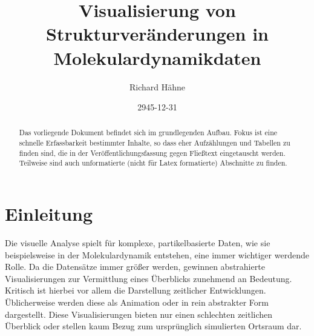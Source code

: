 







\subject{Arbeitsname Bachelorarbeit}
\title{Visualisierung von Strukturveränderungen in Molekulardynamikdaten}

\author{%
	Richard Hähne
}

\date{2945-12-31}


\maketitle

\begin{abstract}
	Das vorliegende Dokument befindet sich im grundlegenden Aufbau. Fokus ist eine schnelle Erfassbarkeit bestimmter Inhalte, so dass eher Aufzählungen und Tabellen zu finden sind, die in der Veröffentlichungsfassung gegen Fließtext eingetauscht werden. Teilweise sind auch unformatierte (nicht für Latex formatierte) Abschnitte zu finden.
	
\end{abstract}


\printacronyms[style=acrotabu] \printsymbols[style=symblongtabu]


\chapter{Einleitung}

Die visuelle Analyse spielt für komplexe, partikelbasierte Daten, wie sie beispielsweise in der Molekulardynamik entstehen, eine immer wichtiger werdende Rolle. Da die Datensätze immer größer werden, gewinnen abstrahierte Visualisierungen zur Vermittlung eines Überblicks zunehmend an Bedeutung. Kritisch ist hierbei vor allem die Darstellung zeitlicher Entwicklungen. Üblicherweise werden diese als Animation oder in rein abstrakter Form dargestellt. Diese Visualisierungen bieten nur einen schlechten zeitlichen Überblick oder stellen kaum Bezug zum ursprünglich simulierten Ortsraum dar.

